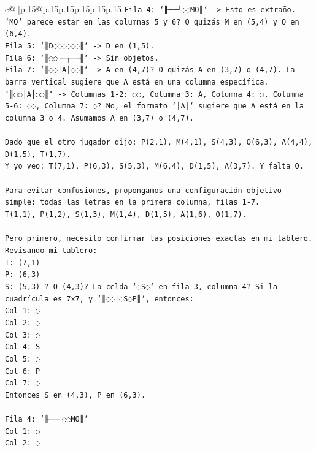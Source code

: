 \documentclass{article}
\begin{document}
{\begin{supertabular}{c@{$\;$}|p{.15\linewidth}@{}p{.15\linewidth}p{.15\linewidth}p{.15\linewidth}p{.15\linewidth}p{.15\linewidth}}
{{{\texttt{Fila 4: `╟──┘◌◌MO║` {-}> Esto es extraño. `MO` parece estar en las columnas 5 y 6? O quizás M en (5,4) y O en (6,4).} \\
\texttt{Fila 5: `║D◌◌◌◌◌◌║` {-}> D en (1,5).} \\
\texttt{Fila 6: `║◌◌┌─┬──╢` {-}> Sin objetos.} \\
\texttt{Fila 7: `║◌◌│A│◌◌║` {-}> A en (4,7)? O quizás A en (3,7) o (4,7). La barra vertical sugiere que A está en una columna específica. `║◌◌│A│◌◌║` {-}> Columnas 1{-}2: ◌◌, Columna 3: A, Columna 4: ◌, Columna 5{-}6: ◌◌, Columna 7: ◌? No, el formato `│A│` sugiere que A está en la columna 3 o 4. Asumamos A en (3,7) o (4,7).} \\
\\ 
\texttt{Dado que el otro jugador dijo: P(2,1), M(4,1), S(4,3), O(6,3), A(4,4), D(1,5), T(1,7).} \\
\texttt{Y yo veo: T(7,1), P(6,3), S(5,3), M(6,4), D(1,5), A(3,7). Y falta O.} \\
\\ 
\texttt{Para evitar confusiones, propongamos una configuración objetivo simple: todas las letras en la primera columna, filas 1{-}7.} \\
\texttt{T(1,1), P(1,2), S(1,3), M(1,4), D(1,5), A(1,6), O(1,7).} \\
\\ 
\texttt{Pero primero, necesito confirmar las posiciones exactas en mi tablero.} \\
\texttt{Revisando mi tablero:} \\
\texttt{T: (7,1)} \\
\texttt{P: (6,3)} \\
\texttt{S: (5,3) ? O (4,3)? La celda `◌S◌` en fila 3, columna 4? Si la cuadrícula es 7x7, y `║◌◌│◌S◌P║`, entonces:} \\
\texttt{Col 1: ◌} \\
\texttt{Col 2: ◌} \\
\texttt{Col 3: ◌} \\
\texttt{Col 4: S} \\
\texttt{Col 5: ◌} \\
\texttt{Col 6: P} \\
\texttt{Col 7: ◌} \\
\texttt{Entonces S en (4,3), P en (6,3).} \\
\\ 
\texttt{Fila 4: `╟──┘◌◌MO║`} \\
\texttt{Col 1: ◌} \\
\texttt{Col 2: ◌} \\
}}}
\end{supertabular}}
\end{document}

